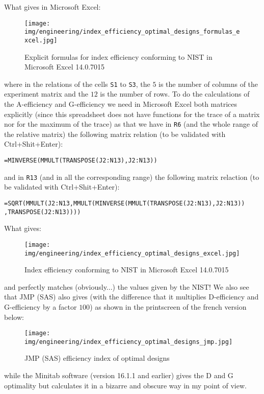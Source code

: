 	What gives in Microsoft Excel:
	\begin{figure}[H]
		\centering
		\texttt{[image: img/engineering/index\_efficiency\_optimal\_designs\_formulas\_excel.jpg]}
		\caption{Explicit formulas for index efficiency conforming to NIST in Microsoft Excel 14.0.7015}
	\end{figure}
	where in the relations of the cells \texttt{S1} to \texttt{S3}, the $5$ is the number of columns of the experiment matrix and the $12$ is the number of rows. To do the calculations of the A-efficiency and G-efficiency we need in Microsoft Excel both matrices explicitly (since this spreadsheet does not have functions for the trace of a matrix nor for the maximum of the trace) as that we have in \texttt{R6} (and the whole range of the relative matrix) the following matrix relation (to be validated with Ctrl+Shit+Enter):
	\begin{center}
		\texttt{=MINVERSE(MMULT(TRANSPOSE(J2:N13),J2:N13))}
	\end{center}
	and in \texttt{R13} (and in all the corresponding range) the following matrix relaction (to be validated with Ctrl+Shit+Enter):
	\begin{center}	
\texttt{=SQRT(MMULT(J2:N13,MMULT(MINVERSE(MMULT(TRANSPOSE(J2:N13),J2:N13))\\
		,TRANSPOSE(J2:N13))))}
	\end{center}
	What gives:
	\begin{figure}[H]
		\centering
		\texttt{[image: img/engineering/index\_efficiency\_optimal\_designs\_excel.jpg]}
		\caption{Index efficiency conforming to NIST in Microsoft Excel 14.0.7015}
	\end{figure}
	and perfectly matches (obviously...) the values given by the NIST! We also see that JMP (SAS) also gives (with the difference that it multiplies D-efficiency and G-efficiency by a factor $100$) as shown in the printscreen of the french version below:
	\begin{figure}[H]
		\centering
		\texttt{[image: img/engineering/index\_efficiency\_optimal\_designs\_jmp.jpg]}
		\caption{JMP (SAS) efficiency index of optimal designs}
	\end{figure}
	while the Minitab software (version 16.1.1 and earlier) gives the D and G optimality but calculates it in a bizarre and obscure way in my point of view.
	
